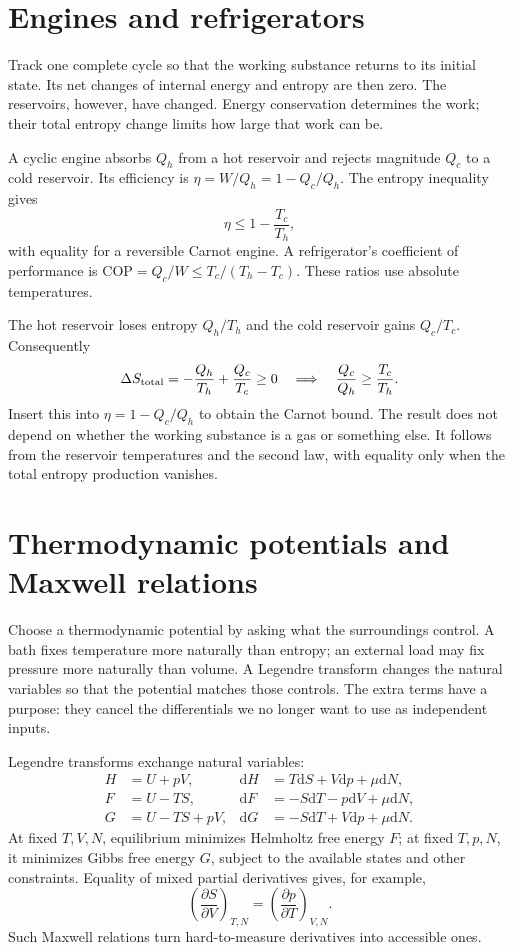 \documentclass[11pt,oneside]{book}
\newcommand{\dd}{\mathrm{d}}
\newcommand{\pd}[2]{\frac{\partial #1}{\partial #2}}
\theoremstyle{reviewstyle}
\begin{document}
\section{Engines and refrigerators}
Track one complete cycle so that the working substance returns to its initial state. Its net changes of internal energy and entropy are then zero. The reservoirs, however, have changed. Energy conservation determines the work; their total entropy change limits how large that work can be.

A cyclic engine absorbs $Q_h$ from a hot reservoir and rejects magnitude $Q_c$ to a cold reservoir. Its efficiency is $\eta=W/Q_h=1-Q_c/Q_h$. The entropy inequality gives
\begin{equation}\eta\leq1-\frac{T_c}{T_h},\end{equation}
with equality for a reversible Carnot engine. A refrigerator's coefficient of performance is $\mathrm{COP}=Q_c/W\leq T_c/(T_h-T_c)$. These ratios use absolute temperatures.

The hot reservoir loses entropy $Q_h/T_h$ and the cold reservoir gains $Q_c/T_c$. Consequently
\begin{equation}
\Delta S_{\rm total}=-\frac{Q_h}{T_h}+\frac{Q_c}{T_c}\geq0
\quad\Longrightarrow\quad \frac{Q_c}{Q_h}\geq\frac{T_c}{T_h}.
\end{equation}
Insert this into $\eta=1-Q_c/Q_h$ to obtain the Carnot bound. The result does not depend on whether the working substance is a gas or something else. It follows from the reservoir temperatures and the second law, with equality only when the total entropy production vanishes.

\section{Thermodynamic potentials and Maxwell relations}
Choose a thermodynamic potential by asking what the surroundings control. A bath fixes temperature more naturally than entropy; an external load may fix pressure more naturally than volume. A Legendre transform changes the natural variables so that the potential matches those controls. The extra terms have a purpose: they cancel the differentials we no longer want to use as independent inputs.

Legendre transforms exchange natural variables:
\begin{align}
H&=U+pV,&\dd H&=T\dd S+V\dd p+\mu\dd N,\\
F&=U-TS,&\dd F&=-S\dd T-p\dd V+\mu\dd N,\\
G&=U-TS+pV,&\dd G&=-S\dd T+V\dd p+\mu\dd N.
\end{align}
At fixed $T,V,N$, equilibrium minimizes Helmholtz free energy $F$; at fixed $T,p,N$, it minimizes Gibbs free energy $G$, subject to the available states and other constraints. Equality of mixed partial derivatives gives, for example,
\begin{equation}\left(\pd{S}{V}\right)_{T,N}=\left(\pd{p}{T}\right)_{V,N}.\end{equation}
Such Maxwell relations turn hard-to-measure derivatives into accessible ones.
\end{document}
